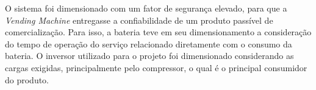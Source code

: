	O sistema foi dimensionado com um fator de segurança elevado, para que a \textit{Vending Machine} entregasse a confiabilidade de um produto passível de comercialização. Para isso, a bateria teve em seu dimensionamento a consideração do tempo de operação do serviço relacionado diretamente com o consumo da bateria. O inversor utilizado para o projeto foi dimensionado considerando as cargas exigidas, principalmente pelo compressor, o qual é o principal consumidor do produto. 
